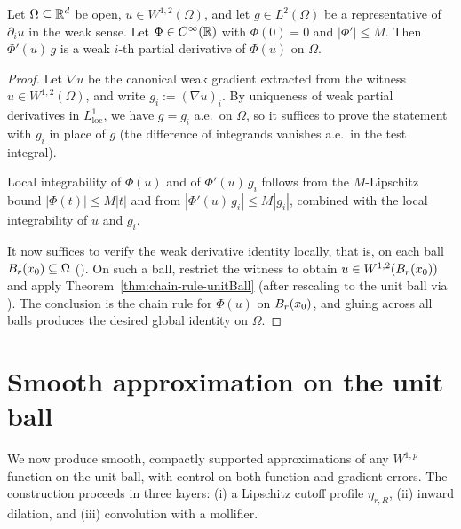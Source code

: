 \begin{theorem}
\label{thm:chain-rule-open}
\leanok
{}
Let $\Omega \subseteq \mathbb{R}^d$ be open, $u \in W^{1,2}(\Omega)$, and let $g \in
L^2(\Omega)$ be a representative of $\partial_i u$ in the weak sense. Let
$\Phi \in C^\infty(\mathbb{R})$ with $\Phi(0)=0$ and $|\Phi'| \le M$. Then
$\Phi'(u)\,g$ is a weak $i$-th partial derivative of $\Phi(u)$ on $\Omega$.
\end{theorem}

\begin{proof}
\leanok
{}

Let $\nabla u$ be the canonical weak gradient extracted from the witness
$u \in W^{1,2}(\Omega)$, and write $g_i := (\nabla u)_i$. By uniqueness of
weak partial derivatives in $L^1_{\mathrm{loc}}$, we have $g = g_i$ a.e.\ on
$\Omega$, so it suffices to prove the statement with $g_i$ in place of $g$
(the difference of integrands vanishes a.e.\ in the test integral).

Local integrability of $\Phi(u)$ and of $\Phi'(u)\,g_i$ follows from the
$M$-Lipschitz bound $|\Phi(t)| \le M|t|$ and from $|\Phi'(u)\,g_i| \le M|g_i|$,
combined with the local integrability of $u$ and $g_i$.

It now suffices to verify the weak derivative identity locally, that is, on
each ball $B_{r}(x_0) \subseteq \Omega$
(). On such a ball, restrict the
witness to obtain $u \in W^{1,2}(B_{r}(x_0))$ and apply
Theorem~\ref{thm:chain-rule-unitBall} (after rescaling to the unit ball via
). The conclusion is the chain
rule for $\Phi(u)$ on $B_{r}(x_0)$, and gluing across all balls produces
the desired global identity on $\Omega$.
\end{proof}

\section{Smooth approximation on the unit ball}

We now produce smooth, compactly supported approximations of any $W^{1,p}$
function on the unit ball, with control on both function and gradient errors.
The construction proceeds in three layers: (i) a Lipschitz cutoff profile
$\eta_{r,R}$, (ii) inward dilation, and (iii) convolution with a mollifier.

